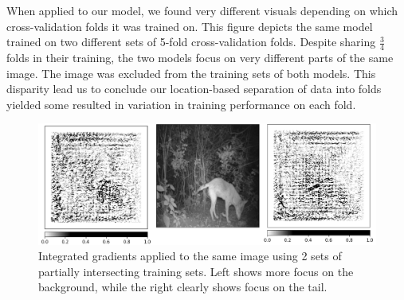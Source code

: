 \documentclass{article}
\begin{document}
When applied to our model, we found very different visuals depending on which cross-validation folds it was trained on. This figure depicts the same model trained on two different sets of 5-fold cross-validation folds. Despite sharing $\frac{3}{4}$ folds in their training, the two models focus on very different parts of the same image. The image was excluded from the training sets of both models. This disparity lead us to conclude our location-based separation of data into folds yielded some resulted in variation in training performance on each fold.

\begin{figure}[H]
\centering
\vspace{0cm}
\includegraphics[width=1.0\textwidth]{fig6.png}
\caption{\label{fig:integrated}Integrated gradients applied to the same image using 2 sets of partially intersecting training sets. Left shows more focus on the background, while the right clearly shows focus on the tail.}
\end{figure}
\end{document}
